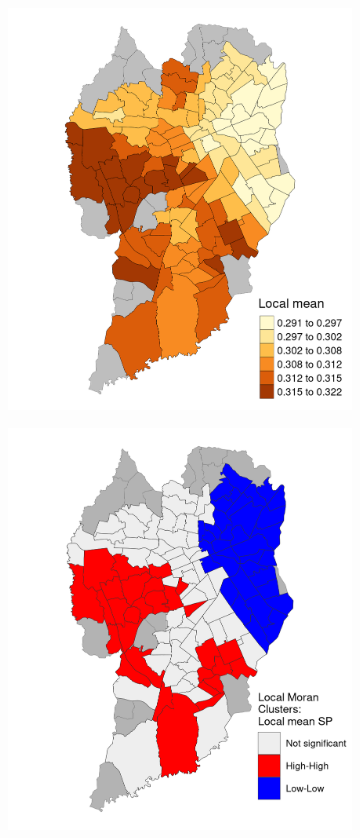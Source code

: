 
\begin{figure}[!htbp]
    \centering\footnotesize
    \captionsetup{font=footnotesize}
    \caption{SPEEDING GW LOCAL MEAN}
    \begin{subfigure}{0.5\textwidth}
        \includegraphics{fig/mean_map.png}
    \end{subfigure}%
    \begin{subfigure}{0.5\textwidth}
        \includegraphics{fig/lisa_LM_SP.png}

\end{subfigure}
\end{figure}
